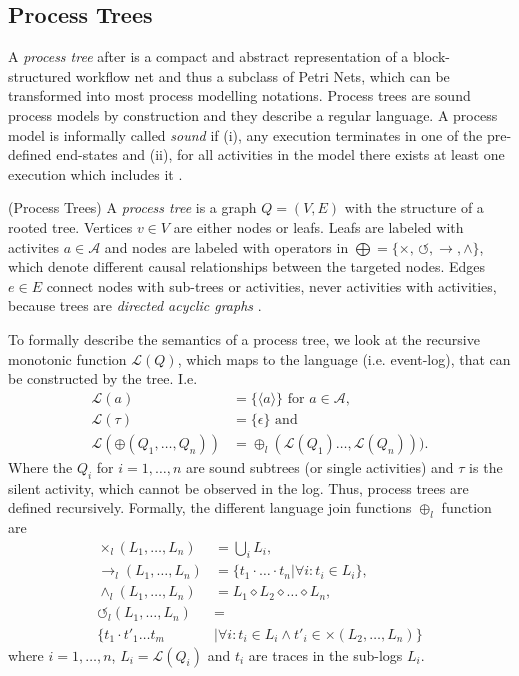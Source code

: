 \documentclass[a4paper]{IEEEtran}
\begin{document}
\subsection{Process Trees}
A \textit{process tree} after \cite{leemans2015scalable} is a compact and abstract representation of a block-structured workflow net and thus a subclass of Petri Nets, which can be transformed into most process modelling notations. Process trees are sound process models by construction and they describe a regular language.
A process model is informally called \textit{sound} if (i), any execution terminates in one of the pre-defined end-states and (ii), for all activities in the model there exists at least one execution which includes it \cite{soundness}.
\begin{defn} (Process Trees) \cite{inductivemining-constructive}
A \textit{process tree} is a graph $Q = (V, E)$ with the structure of a rooted tree. Vertices $v \in V$ are either nodes or leafs. Leafs are labeled with activites $a \in \mathcal{A}$ and nodes are labeled with operators in $\bigoplus = \{ \times, \, \circlearrowleft, \rightarrow, \wedge \}$, which denote different causal relationships between the targeted nodes. Edges $e \in E$ connect nodes with sub-trees or activities, never activities with activities, because trees are \textit{directed acyclic graphs} \cite{treeIntroduction}.
\end{defn}
To formally describe the semantics of a process tree, we look at the recursive monotonic function $\mathcal{L}(Q)$, which maps to the language (i.e. event-log),  that can be constructed by the tree. I.e.
\begin{align*}
   \mathcal{L}(a) &= \{ \langle a \rangle\} \text{ for } a \in \mathcal{A}, \\
   \mathcal{L}(\tau) &= \{ \epsilon \}  \text{ and }\\
    \mathcal{L}(\oplus(Q_1, \dots, Q_n)) &= \oplus_l(\mathcal{L}(Q_1) \dots, \mathcal{L}(Q_n))).
\end{align*}
Where the $Q_i$ for $ i=1, \dots, n$ are sound subtrees (or single activities) and $\tau$ is the silent activity, which cannot be observed in the log. Thus, process trees are defined recursively.
Formally, the different language join functions $\oplus_l$ function are
\begin{align}
\label{eq:operators}
    \times_l(L_1, \dots, L_n) &= \bigcup_{i} L_i, \\
    \rightarrow_l(L_1, \dots, L_n) &= \{ t_1 \cdot \dots \cdot t_n | \forall i : t_i \in L_i\}, \\
    \wedge_l(L_1, \dots, L_n) &= L_1 \diamond L_2 \diamond \dots \diamond L_n, \\
    \circlearrowleft_l(L_1, \dots, L_n) &= \\
    \{ t_1 \cdot t'_1 \dots t_m &| \forall i: t_i \in L_i \wedge t'_i \in \times(L_2,\dots, L_n)\}
\end{align}
where $i = 1, \dots, n$, $L_i = \mathcal{L}(Q_i)$ and $t_i$ are traces in the sub-logs $L_i$.
\end{document}
